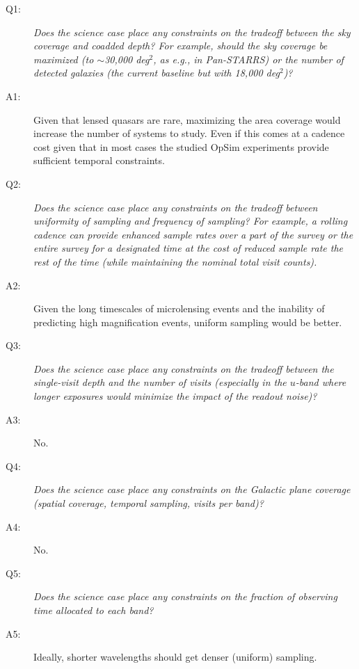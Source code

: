 \begin{description}

\item[Q1:] {\it Does the science case place any constraints on the
tradeoff between the sky coverage and coadded depth? For example, should
the sky coverage be maximized (to $\sim$30,000 deg$^2$, as e.g., in
Pan-STARRS) or the number of detected galaxies (the current baseline but
with 18,000 deg$^2$)?}

\item[A1:] Given that lensed quasars are rare, maximizing the area
coverage would increase the number of systems to study. Even if this
comes at a cadence cost given that in most cases the studied OpSim
experiments provide sufficient temporal constraints.

\item[Q2:] {\it Does the science case place any constraints on the
tradeoff between uniformity of sampling and frequency of  sampling? For
example, a rolling cadence can provide enhanced sample rates over a part
of the survey or the entire survey for a designated time at the cost of
reduced sample rate the rest of the time (while maintaining the nominal
total visit counts).}

\item[A2:] Given the long timescales of microlensing events and the inability of predicting high magnification events, uniform sampling would be better.

\item[Q3:] {\it Does the science case place any constraints on the
tradeoff between the single-visit depth and the number of visits
(especially in the $u$-band where longer exposures would minimize the
impact of the readout noise)?}

\item[A3:] No.

\item[Q4:] {\it Does the science case place any constraints on the
Galactic plane coverage (spatial coverage, temporal sampling, visits per
band)?}

\item[A4:] No.

\item[Q5:] {\it Does the science case place any constraints on the
fraction of observing time allocated to each band?}

\item[A5:] Ideally, shorter wavelengths should get denser (uniform) sampling.


\end{description}
